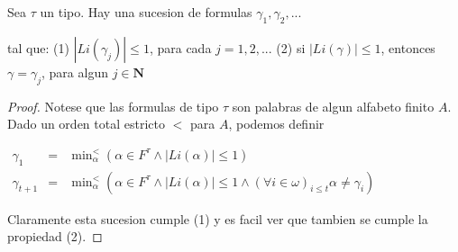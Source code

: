   \begin{lemma}
    Sea \(\tau \) un tipo. Hay una sucesion de formulas
    \(\displaystyle \gamma _{1},\gamma _{2},... \)

    tal que:
    (1) \(\left\vert Li(\gamma _{j})\right\vert \leq 1\), para cada \( j=1,2,...\)
    (2) si \(\left\vert Li(\gamma )\right\vert \leq 1\), entonces \(\gamma =\gamma _{j}\), para algun \(j\in \mathbf{N}\)
  \end{lemma}
  \begin{proof}
    Notese que las formulas de tipo \(\tau \) son palabras de algun alfabeto finito \(A\). Dado un orden total estricto \(< \) para \(A\), podemos definir

    \(\displaystyle \begin{array}{rcl} \gamma _{1} & =& \min\nolimits_{\alpha }^{< }\left( \alpha \in F^{\tau }\wedge \left\vert Li(\alpha )\right\vert \leq 1\right) \\ \gamma _{t+1} & =& \min\nolimits_{\alpha }^{< }\left( \alpha \in F^{\tau }\wedge \left\vert Li(\alpha )\right\vert \leq 1\wedge (\forall i\in \omega )_{i\leq t}\alpha \neq \gamma _{i}\right) \end{array} \)

    Claramente esta sucesion cumple (1) y es facil ver que tambien se cumple la propiedad (2).
  \end{proof}

